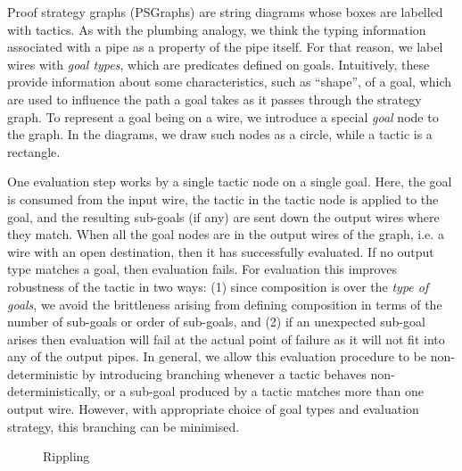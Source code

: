 \documentclass{llncs}
\begin{document}
Proof strategy graphs (PSGraphs) are string diagrams whose boxes are labelled with tactics. As with the plumbing analogy, we think the typing information associated with a pipe as a property of the pipe itself. For that reason, we label wires with \textit{goal types}, which are predicates defined on goals. Intuitively, these provide information about some characteristics, such as ``shape'', of a goal, which are used to influence the path a goal takes as it passes through the strategy graph. To represent a goal being on a wire, we introduce a special \emph{goal} node to the graph. In the diagrams, we draw such nodes as a circle, while a tactic is a rectangle. 

One evaluation step works by a single tactic node on a single goal. Here, the goal is consumed  from the input wire, the tactic in the tactic node is applied to the goal, and the resulting sub-goals (if any) are sent down the output wires where they match. When all the goal nodes are in the output wires of the graph, i.e. a wire with an open destination, then it has successfully evaluated.
If no output type matches a goal, then evaluation fails. For evaluation this improves robustness of the tactic in two ways: (1) since composition is over the \emph{type of goals}, we avoid the brittleness arising from defining composition in terms of the number of sub-goals or order of sub-goals, and (2) if an unexpected sub-goal arises then evaluation will fail at the actual point of failure as it will not fit into any of the output pipes. In general, we allow this evaluation procedure to be non-deterministic by introducing branching whenever a tactic behaves non-deterministically, or a sub-goal produced by a tactic matches more than one output wire. However, with appropriate choice of goal types and evaluation strategy, this branching can be minimised.



\begin{wrapfigure}[14]{r}{0.35\textwidth}
 \centering
 \vspace{-11mm}
 \vspace{-2mm}
 \caption{Rippling}\label{fig:rippling}
\end{wrapfigure}
\end{document}
